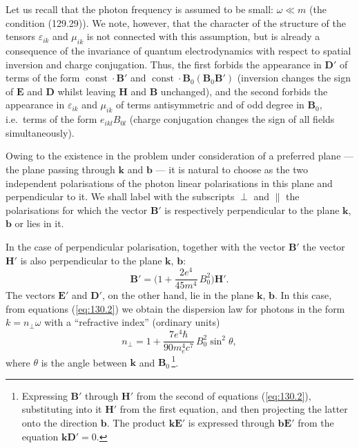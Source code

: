 Let us recall that the photon frequency is assumed to be small: $\omega \ll m$ (the condition (129.29)). We note, however, that the character of the structure of the tensors $\varepsilon_{ik}$ and $\mu_{ik}$ is not connected with this assumption, but is already a consequence of the invariance of quantum electrodynamics with respect to spatial inversion and charge conjugation. Thus, the first forbids the appearance in $\mathbf{D}'$ of terms of the form $\operatorname{const}\cdot\mathbf{B}'$ and $\operatorname{const}\cdot\mathbf{B}_0(\mathbf{B}_0\mathbf{B}')$ (inversion changes the sign of $\mathbf{E}$ and $\mathbf{D}$ whilst leaving $\mathbf{H}$ and $\mathbf{B}$ unchanged), and the second forbids the appearance in $\varepsilon_{ik}$ and $\mu_{ik}$ of terms antisymmetric and of odd degree in $\mathbf{B}_0$, i.e.\ terms of the form $e_{ikl}B_{0l}$ (charge conjugation changes the sign of all fields simultaneously).


Owing to the existence in the problem under consideration of a preferred plane --- the plane passing through $\mathbf{k}$ and $\mathbf{b}$ --- it is natural to choose as the two independent polarisations of the photon linear polarisations in this plane and perpendicular to it. We shall label with the subscripts $\perp$ and $\parallel$ the polarisations for which the vector $\mathbf{B}'$ is respectively perpendicular to the plane $\mathbf{k}$, $\mathbf{b}$ or lies in it.

In the case of perpendicular polarisation, together with the vector $\mathbf{B}'$ the vector $\mathbf{H}'$ is also perpendicular to the plane $\mathbf{k}$, $\mathbf{b}$:
\[
\mathbf{B}' = \biggl(1 + \frac{2e^4}{45m^4}\,B_0^2\biggr)\mathbf{H}'.
\]
The vectors $\mathbf{E}'$ and $\mathbf{D}'$, on the other hand, lie in the plane $\mathbf{k}$, $\mathbf{b}$. In this case, from equations (\ref{eq:130.2}) we obtain the dispersion law for photons in the form $k = n_\perp\omega$ with a ``refractive index'' (ordinary units)
\begin{equation}
n_\perp = 1 + \frac{7e^4\hbar}{90m^4_ec^7}\,B_0^2\sin^2\theta,
\label{eq:130.5}
\end{equation}
where $\theta$ is the angle between $\mathbf{k}$ and $\mathbf{B}_0$\,\footnote{Expressing $\mathbf{B}'$ through $\mathbf{H}'$ from the second of equations (\ref{eq:130.2}), substituting into it $\mathbf{H}'$ from the first equation, and then projecting the latter onto the direction $\mathbf{b}$. The product $\mathbf{k}\mathbf{E}'$ is expressed through $\mathbf{b}\mathbf{E}'$ from the equation $\mathbf{k}\mathbf{D}' = 0$.}.

